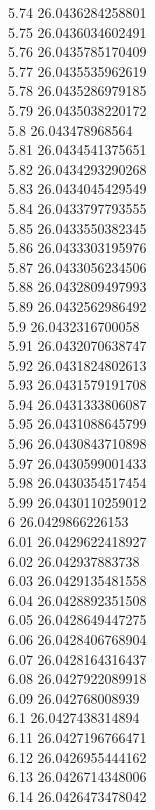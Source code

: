{5.74	26.0436284258801\\
5.75	26.0436034602491\\
5.76	26.0435785170409\\
5.77	26.0435535962619\\
5.78	26.0435286979185\\
5.79	26.0435038220172\\
5.8	26.043478968564\\
5.81	26.0434541375651\\
5.82	26.0434293290268\\
5.83	26.0434045429549\\
5.84	26.0433797793555\\
5.85	26.0433550382345\\
5.86	26.0433303195976\\
5.87	26.0433056234506\\
5.88	26.0432809497993\\
5.89	26.0432562986492\\
5.9	26.0432316700058\\
5.91	26.0432070638747\\
5.92	26.0431824802613\\
5.93	26.0431579191708\\
5.94	26.0431333806087\\
5.95	26.0431088645799\\
5.96	26.0430843710898\\
5.97	26.0430599001433\\
5.98	26.0430354517454\\
5.99	26.0430110259012\\
6	26.0429866226153\\
6.01	26.0429622418927\\
6.02	26.042937883738\\
6.03	26.0429135481558\\
6.04	26.0428892351508\\
6.05	26.0428649447275\\
6.06	26.0428406768904\\
6.07	26.0428164316437\\
6.08	26.0427922089918\\
6.09	26.042768008939\\
6.1	26.0427438314894\\
6.11	26.0427196766471\\
6.12	26.0426955444162\\
6.13	26.0426714348006\\
6.14	26.0426473478042\\
}

